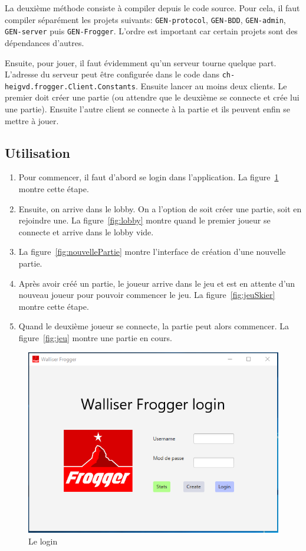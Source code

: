 \documentclass[a4paper,12pt]{article}
\begin{document}
	La deuxième méthode consiste à compiler depuis le code source. Pour cela, il faut compiler séparément les projets suivants: \texttt{GEN-protocol}, \texttt{GEN-BDD}, \texttt{GEN-admin}, \texttt{GEN-server} puis \texttt{GEN-Frogger}. L'ordre est important car certain projets sont des dépendances d'autres.
	
	Ensuite, pour jouer, il faut évidemment qu'un serveur tourne quelque part. L'adresse du serveur peut être configurée dans le code dans \texttt{ch-heigvd.frogger.Client.Constants}. Ensuite lancer au moins deux clients. Le premier doit créer une partie (ou attendre que le deuxième se connecte et crée lui une partie). Ensuite l'autre client se connecte à la partie et ils peuvent enfin se mettre à jouer.
	
	\subsection{Utilisation}
	
	\begin{enumerate}
		\item Pour commencer, il faut d'abord se login dans l'application. La figure~\ref{fig:login} montre cette étape.
		\item Ensuite, on arrive dans le lobby. On a l'option de soit créer une partie, soit en rejoindre une. La figure~\ref{fig:lobby} montre quand le premier joueur se connecte et arrive dans le lobby vide.
		\item La figure~\ref{fig:nouvellePartie} montre l'interface de création d'une nouvelle partie.
		\item Après avoir créé un partie, le joueur arrive dans le jeu et est en attente d'un nouveau joueur pour pouvoir commencer le jeu. La figure~\ref{fig:jeuSkier} montre cette étape.
		\item Quand le deuxième joueur se connecte, la partie peut alors commencer. La figure~\ref{fig:jeu} montre une partie en cours.
	\end{enumerate}	

	\begin{figure}[ht]
		\centering
		\includegraphics[width=\textwidth]{../Screenshots/login.PNG}
		\caption{Le login}
		\label{fig:login}
	\end{figure}
\end{document}
